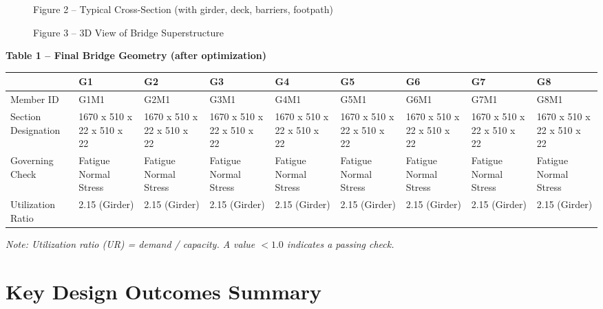 \documentclass[12pt,a4paper]{report}
\numberwithin{table}{chapter}
\numberwithin{figure}{chapter}
\begin{document}
\newpage

\begin{figure}[H]
\centering
{}
\caption*{Figure 2 -- Typical Cross-Section (with girder, deck, barriers, footpath)}
\end{figure}

\begin{figure}[H]
\centering
{}
\caption*{Figure 3 -- 3D View of Bridge Superstructure}
\end{figure}

\noindent\textbf{Table 1 -- Final Bridge Geometry (after optimization)}

\vspace{0.4em}
\noindent
\begin{tabular}{|C{2.8cm}|C{1.5cm}|C{1.5cm}|C{1.5cm}|C{1.5cm}|C{1.5cm}|C{1.5cm}|C{1.5cm}|C{1.5cm}|}
\hline
  \textbf{} &
  \textbf{G1} &
  \textbf{G2} &
  \textbf{G3} &
  \textbf{G4} &
  \textbf{G5} &
  \textbf{G6} &
  \textbf{G7} &
  \textbf{G8} \\
\hline
Member ID & G1M1 & G2M1 & G3M1 & G4M1 & G5M1 & G6M1 & G7M1 & G8M1 \\
\hline
Section Designation & 1670 x 510 x 22 x 510 x 22 & 1670 x 510 x 22 x 510 x 22 & 1670 x 510 x 22 x 510 x 22 & 1670 x 510 x 22 x 510 x 22 & 1670 x 510 x 22 x 510 x 22 & 1670 x 510 x 22 x 510 x 22 & 1670 x 510 x 22 x 510 x 22 & 1670 x 510 x 22 x 510 x 22 \\
\hline
Governing Check & Fatigue Normal Stress & Fatigue Normal Stress & Fatigue Normal Stress & Fatigue Normal Stress & Fatigue Normal Stress & Fatigue Normal Stress & Fatigue Normal Stress & Fatigue Normal Stress \\
\hline
Utilization Ratio & 2.15 (Girder) & 2.15 (Girder) & 2.15 (Girder) & 2.15 (Girder) & 2.15 (Girder) & 2.15 (Girder) & 2.15 (Girder) & 2.15 (Girder) \\
\hline
\end{tabular}

\vspace{0.4em}
\noindent\textit{Note: Utilization ratio (UR) = demand / capacity. A value $< 1.0$ indicates a passing check.}

\vspace{1em}

\section*{Key Design Outcomes Summary}
\label{sec:key-outcomes}
\end{document}
